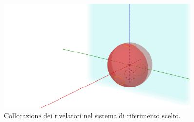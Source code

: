 \begin{figure}[h]\centering\includegraphics[width=0.9\textwidth]{../../img/sfera_sdr.png}\caption{Collocazione dei rivelatori nel sistema di riferimento scelto. }\label{fig:sfera_sdr}\end{figure}
